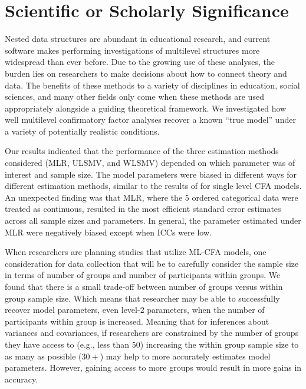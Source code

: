 \documentclass[man, noextraspace, 12pt]{apa7}
\begin{document}
\section{Scientific or Scholarly Significance}

Nested data structures are abundant in educational research, and current software makes performing investigations of multilevel structures more widespread than ever before.
Due to the growing use of these analyses, the burden lies on researchers to make decisions about how to connect theory and data.
The benefits of these methods to a variety of disciplines in education, social sciences, and many other fields only come when these methods are used appropriately alongside a guiding theoretical framework. 
We investigated how well multilevel confirmatory factor analyses recover a known ``true model'' under a variety of potentially realistic conditions.

Our results indicated that the performance of the three estimation methods considered (MLR, ULSMV, and WLSMV) depended on which parameter was of interest and sample size.
The model parameters were biased in different ways for different estimation methods, similar to the results of \citep{DiStefano2014} for single level CFA models.
An unexpected finding was that MLR, where the 5 ordered categorical data were treated as continuous, resulted in the most efficient standard error estimates across all sample sizes and parameters.
In general, the parameter estimated under MLR were negatively biased except when ICCs were low.

When researchers are planning studies that utilize ML-CFA models, one consideration for data collection that will be to carefully consider the sample size in terms of number of groups and number of participants within groups.
We found that there is a small trade-off between number of groups versus within group  sample size. 
Which means that researcher may be able to successfully recover model parameters, even level-2 parameters, when the number of participants within group is increased.
Meaning that for inferences about variances and covariances, if researchers are constrained by the number of groups they have access to (e.g., less than 50) increasing the within group sample size to as many as possible ($30+$) may help to more accurately estimates model parameters.
However, gaining access to more groups would result in more gains in accuracy.


\newpage
\raggedright
% 
%
\printbibliography
\end{document}
